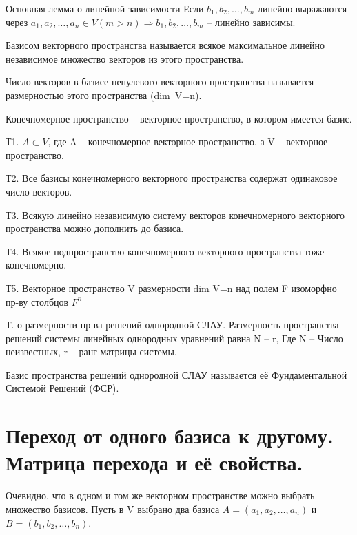 \documentclass{article}
\begin{document}
\textsf{Основная лемма о линейной зависимости}
Если $b_1,b_2,\dots,b_m$ линейно выражаются через $a_1,a_2,\dots,a_n\in V (m>n) \Rightarrow b_1,b_2,\dots,b_m$ – линейно зависимы.

\textsf{Базисом} векторного пространства называется всякое максимальное линейно независимое множество векторов из этого пространства.

Число векторов в базисе ненулевого векторного пространства называется \textsf{размерностью} этого пространства (dim\ V=n).

\textsf{Конечномерное пространство} – векторное пространство, в котором имеется базис.

Т1. $A\subset V$, где A – конечномерное векторное пространство, а V – векторное пространство.

Т2. Все базисы конечномерного векторного пространства содержат одинаковое число векторов.

Т3. Всякую линейно независимую систему векторов конечномерного векторного пространства можно дополнить до базиса.

Т4. Всякое подпространство конечномерного векторного пространства тоже конечномерно.

Т5. Векторное пространство V размерности dim V=n над полем F изоморфно пр-ву столбцов $F^n$

\textsf{Т. о размерности пр-ва решений однородной СЛАУ.} Размерность пространства решений системы линейных однородных уравнений равна N – r, Где N – Число неизвестных, r – ранг матрицы системы.

Базис пространства решений однородной СЛАУ называется её Фундаментальной Системой Решений (ФСР).

\section{Переход от одного базиса к другому. Матрица перехода и её свойства.}

Очевидно, что в одном и том же векторном пространстве можно выбрать множество базисов. Пусть в V выбрано два базиса $A=(a_1,a_2,\dots,a_n)$ и $B=(b_1,b_2,\dots,b_n)$.
\end{document}
